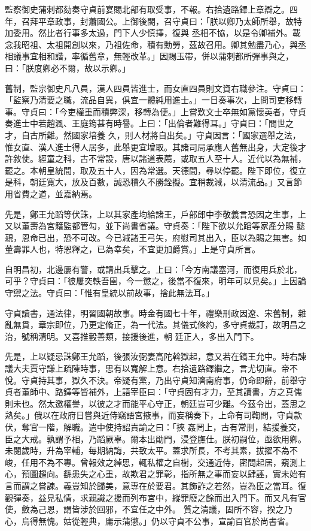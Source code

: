 \begin{pinyinscope}
 監察御史蒲刺都劾奏守貞前宴賜北部有取受事，不報。右拾遺路鐸上章辯之。四年，召拜平章政事，封蕭國公。上御後閤，召守貞曰：「朕以卿乃太師所舉，故特加委用。然比者行事多太過，門下人少慎擇，復與
 丞相不協，以是令卿補外。載念我昭祖、太祖開創以來，乃祖佐命，積有勳勞，茲故召用。卿其勉盡乃心，與丞相議事宜相和諧，率循舊章，無輕改革。」因賜玉帶，併以蒲刺都所彈事與之，曰：「朕度卿必不爾，故以示卿。」



 舊制，監宗御史凡八員，漢人四員皆進士，而女直四員則文資右職參注。守貞曰：「監察乃清要之職，流品自異，俱宜一體純用進士。」一日奏事次，上問司吏移轉事。守貞曰：「今吏權重而積弊深，移轉為便。」上嘗歎文士卒無如黨懷英者，守貞奏進士中若趙渢、王庭筠甚有時譽。上曰：「出倫者難得耳。」守貞曰：「間世之才，自古所難。然國家培養
 久，則人材將自出矣。」守貞因言：「國家選舉之法，惟女直、漢人進士得人居多，此舉更宜增取。其諸司局承應人舊無出身，大定後才許敘使。經童之科，古不常設，唐以諸道表薦，或取五人至十人。近代以為無補，罷之。本朝皇統間，取及五十人，因為常選。天德間，尋以停罷。陛下即位，復立是科，朝廷寬大，放及百數，誠恐積久不勝銓擬。宜稍裁減，以清流品。」又言節用省費之道，並嘉納焉。



 先是，鄭王允蹈等伏誅，上以其家產均給諸王，戶部郎中李敬義言恐因之生事，上又以董壽為宮籍監都管勾，並下尚書省議。守貞奏：「陛下欲以允蹈等家產分賜
 懿親，恩命已出，恐不可改。今已減諸王弓矢，府慰司其出入，臣以為賜之無害。如董壽罪人也，特恩釋之，已為幸矣，不宜更加爵賞。」上是守貞所言。



 自明昌初，北邊屢有警，或請出兵擊之。上曰：「今方南議塞河，而復用兵於北，可乎？守貞曰：「彼屢突軼吾圉，今一懲之，後當不復來，明年可以見矣。」上因論守禦之法。守貞曰：「惟有皇統以前故事，捨此無法耳。」



 守貞讀書，通法律，明習國朝故事。時金有國七十年，禮樂刑政因遼、宋舊制，雜亂無貫，章宗即位，乃更定脩正，為一代法。其儀式條約，多守貞裁訂，故明昌之治，號稱清明。又喜推轂善類，接援後進，朝
 廷正人，多出入門下。



 先是，上以疑忌誅鄭王允蹈，後張汝弼妻高陀斡獄起，意又若在鎬王允中。時右諫議大夫賈守謙上疏陳時事，思有以寬解上意。右拾遺路鐸繼之，言尤切直。帝不悅。守貞持其事，獄久不決。帝疑有黨，乃出守貞知濟南府事，仍命即辭，前舉守貞者董師中、路鐸等皆補外，上語宰臣曰：「守貞固有才力，至其讀書，方之真儒則未也。然太邀權譽，以彼之才而能平心守正，朝廷豈可少離。今茲令出，蓋思之熟矣。」俄以在政府日嘗與近侍竊語宮掖事，而妄稱奏下，上命有司鞫問，守貞款伏，奪官一階，解職。遣中使持詔責諭之曰：「挾
 姦罔上，古有常刑，結援養交，臣之大戒。孰謂予相，乃蹈厥辜。爾本出勛門，浸登膴仕。朕初嗣位，亟欲用卿。未閱歲時，升為宰輔，每期納誨，共致太平。蓋求所長，不考其素，拔擢不為不峻，任用不為不專。曾報效之綽思，輒私權之自樹，交通近侍，密問起居，窺測上心，預圖趨向。繇患失之心重，故欺君之罪彰，指所無之事而妄以肆誣，實未始有言而謂之嘗諫。義豈知於歸美，意專在於要君。其飾詐之若然，豈為臣之當耳。復觀彈奏，益見私情，求親識之援而列布宮中，縱罪廢之餘而出入門下。而又凡有官使，斂為己恩，謂皆涉於回邪，不宜任之中外。
 質之清議，固所不容，揆之乃心，烏得無愧。姑從輕典，庸示蒲懲。」仍以守貞不公事，宣諭百官於尚書省。




\end{pinyinscope}
